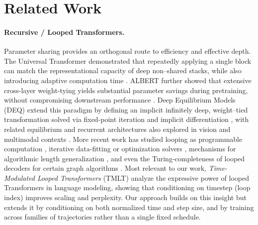 \section{Related Work}
\label{sec:literature}

\paragraph{Recursive / Looped Transformers.}
\vspace{-1mm}
Parameter sharing provides an orthogonal route to efficiency and effective depth. The Universal Transformer demonstrated that repeatedly applying a single block can match the representational capacity of deep non–shared stacks, while also introducing adaptive computation time \cite{dehghani2018universal}. ALBERT further showed that extensive cross-layer weight-tying yields substantial parameter savings during pretraining, without compromising downstream performance \cite{lan2019albert}. Deep Equilibrium Models (DEQ) extend this paradigm by defining an implicit infinitely deep, weight–tied transformation solved via fixed-point iteration and implicit differentiation \cite{bai2019deep}, with related equilibrium and recurrent architectures also explored in vision and multimodal contexts \cite{jaegle2021perceiver, yang2022recurring}. More recent work has studied looping as programmable computation \cite{giannou2023looped}, iterative data-fitting or optimization solvers \cite{yang2023looped}, mechanisms for algorithmic length generalization \cite{fan2024looped}, and even the Turing-completeness of looped decoders for certain graph algorithms \cite{de2024simulation}. Most relevant to our work, \emph{Time-Modulated Looped Transformers} (TMLT) \cite{xu2024expressive} analyze the expressive power of looped Transformers in language modeling, showing that conditioning on timestep (loop index) improves scaling and perplexity. Our approach builds on this insight but extends it by conditioning on both normalized time and step size, and by training across families of trajectories rather than a single fixed schedule.


